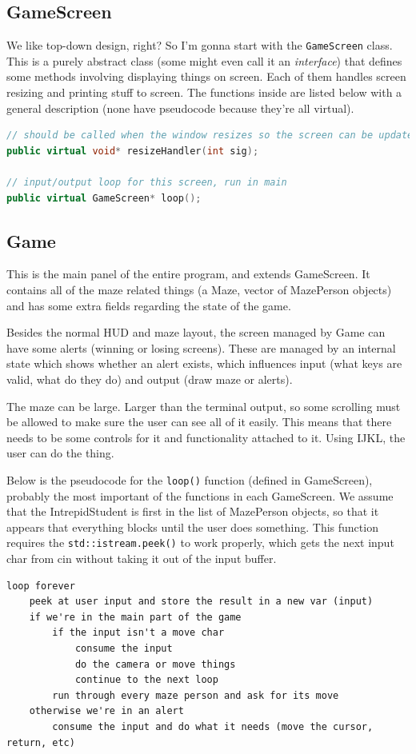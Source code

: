 \documentclass[11pt]{article} %
\begin{document}
\subsection{GameScreen}
We like top-down design, right? So I'm gonna start with the \verb|GameScreen| class. This is a purely abstract class (some might even call it an \textit{interface}) that defines some methods involving displaying things on screen. Each of them handles screen resizing and printing stuff to screen. The functions inside are listed below with a general description (none have pseudocode because they're all virtual).
\begin{lstlisting}[language=C++]
// should be called when the window resizes so the screen can be updated accordingly
public virtual void* resizeHandler(int sig);

// input/output loop for this screen, run in main
public virtual GameScreen* loop();
\end{lstlisting}

\subsection{Game}
This is the main panel of the entire program, and extends GameScreen. It contains all of the maze related things (a Maze, vector of MazePerson objects) and has some extra fields regarding the state of the game. 

Besides the normal HUD and maze layout, the screen managed by Game can have some alerts (winning or losing screens). These are managed by an internal state which shows whether an alert exists, which influences input (what keys are valid, what do they do) and output (draw maze or alerts). 

The maze can be large. Larger than the terminal output, so some scrolling must be allowed to make sure the user can see all of it easily. This means that there needs to be some controls for it and functionality attached to it. Using IJKL, the user can do the thing. 

Below is the pseudocode for the \verb|loop()| function (defined in GameScreen), probably the most important of the functions in each GameScreen. We assume that the IntrepidStudent is first in the list of MazePerson objects, so that it appears that everything blocks until the user does something. This function requires the \verb|std::istream.peek()| to work properly, which gets the next input char from cin without taking it out of the input buffer. 

\begin{lstlisting}
loop forever
	peek at user input and store the result in a new var (input)
	if we're in the main part of the game
		if the input isn't a move char
			consume the input
			do the camera or move things
			continue to the next loop
		run through every maze person and ask for its move
	otherwise we're in an alert
		consume the input and do what it needs (move the cursor, return, etc)
\end{lstlisting}
\end{document}
